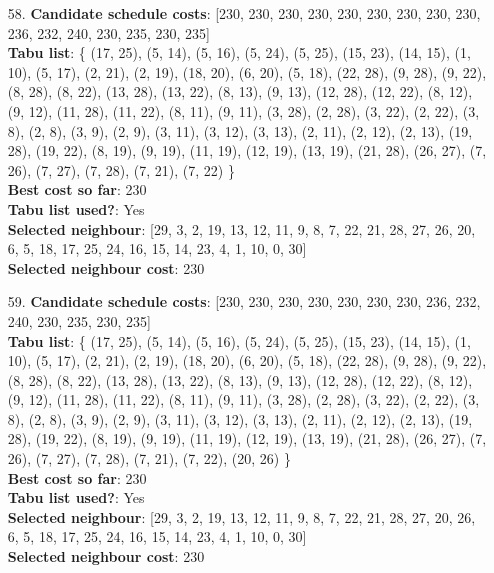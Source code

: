 \documentclass[fleqn]{article}
\begin{document}
\begin{itemize}
    \item[58.] \textbf{Candidate schedule costs}: [230, 230, 230, 230, 230, 230, 230, 230, 230, 236, 232, 240, 230, 235, 230, 235] \\
    \textbf{Tabu list}: \{ (17, 25), (5, 14), (5, 16), (5, 24), (5, 25), (15, 23), (14, 15), (1, 10), (5, 17), (2, 21), (2, 19), (18, 20), (6, 20), (5, 18), (22, 28), (9, 28), (9, 22), (8, 28), (8, 22), (13, 28), (13, 22), (8, 13), (9, 13), (12, 28), (12, 22), (8, 12), (9, 12), (11, 28), (11, 22), (8, 11), (9, 11), (3, 28), (2, 28), (3, 22), (2, 22), (3, 8), (2, 8), (3, 9), (2, 9), (3, 11), (3, 12), (3, 13), (2, 11), (2, 12), (2, 13), (19, 28), (19, 22), (8, 19), (9, 19), (11, 19), (12, 19), (13, 19), (21, 28), (26, 27), (7, 26), (7, 27), (7, 28), (7, 21), (7, 22) \} \\
    \textbf{Best cost so far}: 230 \\
    \textbf{Tabu list used?}: Yes \\
    \textbf{Selected neighbour}: [29, 3, 2, 19, 13, 12, 11, 9, 8, 7, 22, 21, 28, 27, 26, 20, 6, 5, 18, 17, 25, 24, 16, 15, 14, 23, 4, 1, 10, 0, 30] \\
    \textbf{Selected neighbour cost}: 230
      

    \item[59.] \textbf{Candidate schedule costs}: [230, 230, 230, 230, 230, 230, 230, 236, 232, 240, 230, 235, 230, 235] \\
    \textbf{Tabu list}: \{ (17, 25), (5, 14), (5, 16), (5, 24), (5, 25), (15, 23), (14, 15), (1, 10), (5, 17), (2, 21), (2, 19), (18, 20), (6, 20), (5, 18), (22, 28), (9, 28), (9, 22), (8, 28), (8, 22), (13, 28), (13, 22), (8, 13), (9, 13), (12, 28), (12, 22), (8, 12), (9, 12), (11, 28), (11, 22), (8, 11), (9, 11), (3, 28), (2, 28), (3, 22), (2, 22), (3, 8), (2, 8), (3, 9), (2, 9), (3, 11), (3, 12), (3, 13), (2, 11), (2, 12), (2, 13), (19, 28), (19, 22), (8, 19), (9, 19), (11, 19), (12, 19), (13, 19), (21, 28), (26, 27), (7, 26), (7, 27), (7, 28), (7, 21), (7, 22), (20, 26) \} \\
    \textbf{Best cost so far}: 230 \\
    \textbf{Tabu list used?}: Yes \\
    \textbf{Selected neighbour}: [29, 3, 2, 19, 13, 12, 11, 9, 8, 7, 22, 21, 28, 27, 20, 26, 6, 5, 18, 17, 25, 24, 16, 15, 14, 23, 4, 1, 10, 0, 30] \\
    \textbf{Selected neighbour cost}: 230
      


\end{itemize}
\end{document}
